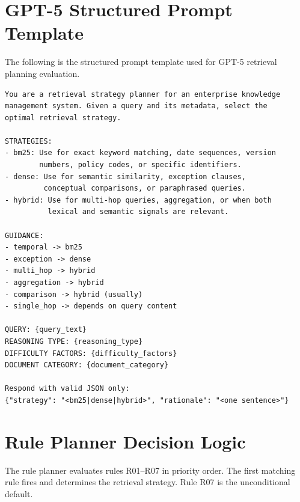 \documentclass[12pt, a4paper, twoside]{report}
\begin{document}
\chapter{GPT-5 Structured Prompt Template}
\label{app:prompt}

The following is the structured prompt template used for GPT-5 retrieval planning evaluation.

\begin{lstlisting}[language={},caption={GPT-5 Structured Retrieval Planning Prompt},label={lst:prompt}]
You are a retrieval strategy planner for an enterprise knowledge
management system. Given a query and its metadata, select the
optimal retrieval strategy.

STRATEGIES:
- bm25: Use for exact keyword matching, date sequences, version
        numbers, policy codes, or specific identifiers.
- dense: Use for semantic similarity, exception clauses,
         conceptual comparisons, or paraphrased queries.
- hybrid: Use for multi-hop queries, aggregation, or when both
          lexical and semantic signals are relevant.

GUIDANCE:
- temporal -> bm25
- exception -> dense
- multi_hop -> hybrid
- aggregation -> hybrid
- comparison -> hybrid (usually)
- single_hop -> depends on query content

QUERY: {query_text}
REASONING TYPE: {reasoning_type}
DIFFICULTY FACTORS: {difficulty_factors}
DOCUMENT CATEGORY: {document_category}

Respond with valid JSON only:
{"strategy": "<bm25|dense|hybrid>", "rationale": "<one sentence>"}
\end{lstlisting}

\chapter{Rule Planner Decision Logic}
\label{app:rules}

The rule planner evaluates rules R01--R07 in priority order. The first matching rule fires and determines the retrieval strategy. Rule R07 is the unconditional default.
\end{document}
